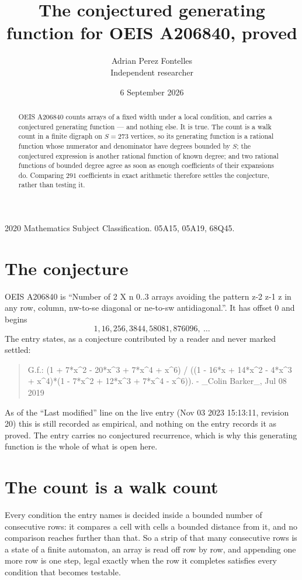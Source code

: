 \documentclass[11pt,a4paper]{article}
\title{The conjectured generating function for OEIS A206840, proved}
\author{Adrian Perez Fontelles\\ \small Independent researcher}
\date{6 September 2026}
\theoremstyle{plain}
\theoremstyle{definition}
\begin{document}
\maketitle

\begin{abstract}
OEIS A206840 counts arrays of a fixed width under a local condition, and carries a conjectured
generating function --- and nothing else. It is true. The count is a walk count in a finite
digraph on $S=273$ vertices, so its generating function is a rational function whose numerator
and denominator have degrees bounded by $S$; the conjectured expression is another rational
function of known degree; and two rational functions of bounded degree agree as soon as enough
coefficients of their expansions do. Comparing $291$ coefficients in exact arithmetic
therefore settles the conjecture, rather than testing it.
\end{abstract}

\noindent\small 2020 Mathematics Subject Classification. 05A15, 05A19, 68Q45.\normalsize

\section{The conjecture}

OEIS A206840 is ``Number of 2 X n 0..3 arrays avoiding the pattern z-2 z-1 z in any row, column, nw-to-se diagonal or ne-to-sw antidiagonal.''. It has offset $0$ and begins
\[
1, 16, 256, 3844, 58081, 876096,\ \dots
\]
The entry states, as a conjecture contributed by a reader and never marked settled:
\begin{quote}
G.f.: (1 + 7*x\^{}2 - 20*x\^{}3 + 7*x\^{}4 + x\^{}6) / ((1 - 16*x + 14*x\^{}2 - 4*x\^{}3 + x\^{}4)*(1 - 7*x\^{}2 + 12*x\^{}3 + 7*x\^{}4 - x\^{}6)). - \_Colin Barker\_, Jul 08 2019
\end{quote}
As of the ``Last modified'' line on the live entry (Nov 03 2023 15:13:11, revision 20) this is still
recorded as empirical, and nothing on the entry records it as proved. The entry carries no
conjectured recurrence, which is why this generating function is the whole of what is open
here.

\section{The count is a walk count}

Every condition the entry names is decided inside a bounded number of consecutive rows: it
compares a cell with cells a bounded distance from it, and no comparison reaches further than
that. So a strip of that many consecutive rows is a state of a finite automaton, an array is
read off row by row, and appending one more row is one step, legal exactly when the row it
completes satisfies every condition that becomes testable.
\end{document}

